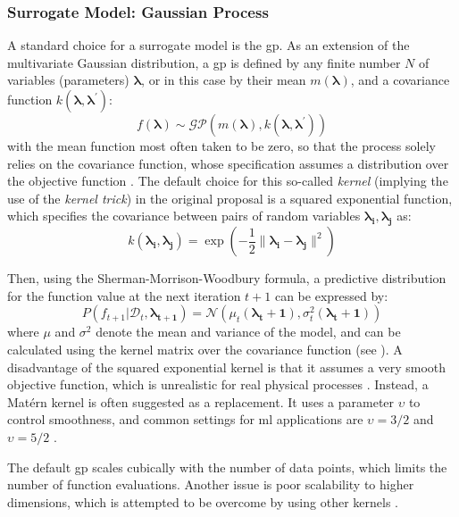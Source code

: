 \subsubsection{Surrogate Model: Gaussian Process}
A standard choice for a surrogate model is the \gls{gp}. As an extension of the multivariate Gaussian distribution, a \gls{gp} is defined by any finite number $N$ of variables (parameters) $\mathbf{\lambda}$, or in this case by their mean $m(\mathbf{\lambda})$, and a covariance function $k(\mathbf{\lambda},\mathbf{\lambda}^{\prime})$:
\begin{equation}
	f(\mathbf{\lambda}) \sim \mathcal{GP}(m(\mathbf{\lambda}), k(\mathbf{\lambda},\mathbf{\lambda}^{\prime}))
\end{equation}
with the mean function most often taken to be zero, so that the process solely relies on the covariance function, whose specification assumes a distribution over the objective function \cite{williams2006gaussian}. The default choice for this so-called \textit{kernel} (implying the use of the \textit{kernel trick}) in the original proposal is a squared exponential function, which specifies the covariance between pairs of random variables $\mathbf{\lambda_i},\mathbf{\lambda_j}$ as:
\begin{equation}
	k(\mathbf{\lambda_i},\mathbf{\lambda_j}) = \exp \left(  -\frac{1}{2} \lVert \mathbf{\lambda_i} - \mathbf{\lambda_j} \rVert^2 \right) 
\end{equation}

Then, using the Sherman-Morrison-Woodbury formula, a predictive distribution for the function value at the next iteration $t+1$ can be expressed by:
\begin{equation}
	P(f_{t+1} | \mathcal{D}_t, \mathbf{\lambda_{t+1}} ) = \mathcal{N}(\mu_t(\mathbf{\lambda_t+1}), \sigma^2_t(\mathbf{\lambda_t+1}))
\end{equation}
where $\mu$ and $\sigma^2$ denote the mean and variance of the model, and can be calculated using the kernel matrix over the covariance function (see \cite[p.8]{brochu2010tutorial}).
A disadvantage of the squared exponential kernel is that it assumes a very smooth objective function, which is unrealistic for real physical processes \cite{stein1999interpolation}.  
Instead, a Matérn kernel is often suggested as a replacement. It uses a parameter $\upsilon$ to control  smoothness, and common settings for \gls{ml} applications are $\upsilon = 3/2$ and $\upsilon=5/2$ \cite{williams2006gaussian}.

The default \gls{gp} scales cubically with the number of data points, which limits the number of function evaluations. Another issue is poor scalability to higher dimensions, which is attempted to be overcome by using other kernels \cite{feurer2019hyperparameter}.


